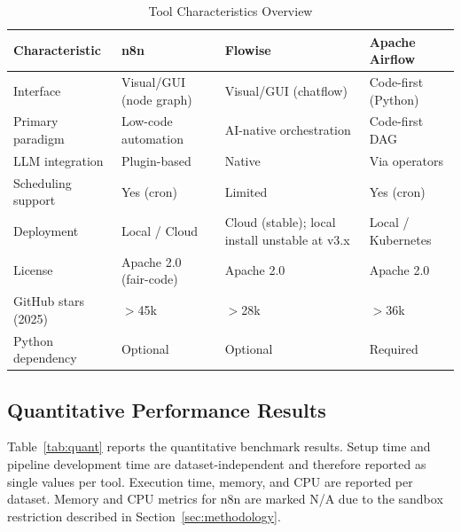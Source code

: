 \documentclass[journal]{IEEEtran}
\begin{document}
\begin{table}[!t]
  \caption{Tool Characteristics Overview}
  \label{tab:characteristics}
  \renewcommand{\arraystretch}{1.25}
  \centering
  \small
  \begin{tabular}{@{}lp{3.2cm}p{3.2cm}p{3.2cm}@{}}
    \toprule
    \textbf{Characteristic}   & \textbf{n8n}       & \textbf{Flowise}     & \textbf{Apache Airflow} \\
    \midrule
    Interface                 & Visual/GUI (node graph)  & Visual/GUI (chatflow)  & Code-first (Python) \\
    Primary paradigm          & Low-code automation      & AI-native orchestration & Code-first DAG      \\
    LLM integration           & Plugin-based             & Native                  & Via operators       \\
    Scheduling support        & Yes (cron)               & Limited                 & Yes (cron)          \\
    Deployment                & Local / Cloud            & Cloud (stable); local install unstable at v3.x & Local / Kubernetes \\
    License                   & Apache 2.0 (fair-code)   & Apache 2.0              & Apache 2.0          \\
    GitHub stars (2025)       & $>$45k                   & $>$28k                  & $>$36k              \\
    Python dependency         & Optional                 & Optional                & Required            \\
    \bottomrule
  \end{tabular}
\end{table}

\subsection{Quantitative Performance Results}

Table~\ref{tab:quant} reports the quantitative benchmark results.
Setup time and pipeline development time are dataset-independent and
therefore reported as single values per tool. Execution time, memory,
and CPU are reported per dataset. Memory and CPU metrics for n8n are
marked N/A due to the sandbox restriction described in
Section~\ref{sec:methodology}.
\end{document}
